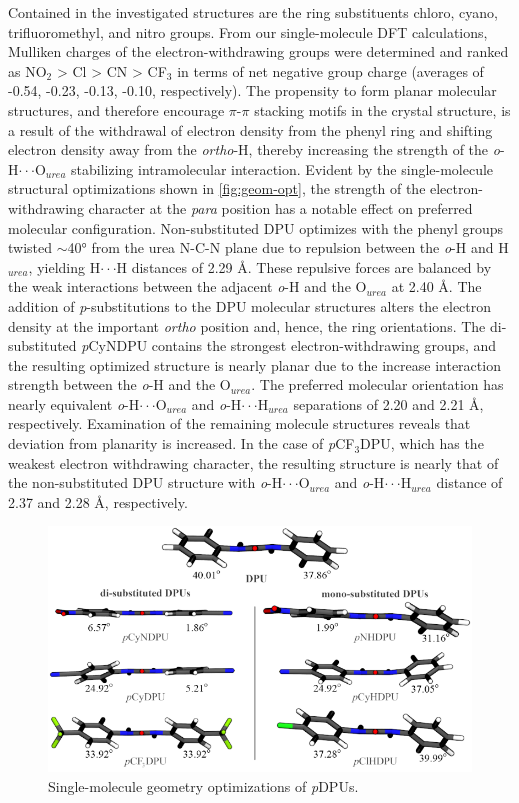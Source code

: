 Contained in the investigated structures are the ring substituents chloro, cyano, trifluoromethyl, and nitro groups. From our single-molecule DFT calculations, Mulliken charges of the electron-withdrawing groups were determined and ranked as NO$_{2}$ > Cl > CN > CF$_{3}$ in terms of net negative group charge (averages of -0.54, -0.23, -0.13, -0.10, respectively). The propensity to form planar molecular structures, and therefore encourage $\pi$-$\pi$ stacking motifs in the crystal structure, is a result of the withdrawal of electron density from the phenyl ring and shifting electron density away from the \textit{ortho}-H, thereby increasing the strength of the \textit{o}-H$\cdot \cdot \cdot$O$_{urea}$ stabilizing intramolecular interaction. Evident by the single-molecule structural optimizations shown in \autoref{fig:geom-opt}, the strength of the electron-withdrawing character at the \textit{para} position has a notable effect on preferred molecular configuration. Non-substituted DPU optimizes with the phenyl groups twisted $\sim$40° from the urea N-C-N plane due to repulsion between the \textit{o}-H and H$_{urea}$, yielding H$\cdot \cdot \cdot$H distances of 2.29 \AA. These repulsive forces are balanced by the weak interactions between the adjacent \textit{o}-H and the O$_{urea}$ at 2.40 \AA. The addition of \textit{p}-substitutions to the DPU molecular structures alters the electron density at the important \textit{ortho} position and, hence, the ring orientations. The di-substituted \textit{p}CyNDPU contains the strongest electron-withdrawing groups, and the resulting optimized structure is nearly planar due to the increase interaction strength between the \textit{o}-H and the O$_{urea}$. The preferred molecular orientation has nearly equivalent \textit{o}-H$\cdot \cdot \cdot$O$_{urea}$ and \textit{o}-H$\cdot \cdot \cdot$H$_{urea}$ separations of 2.20 and 2.21 \AA, respectively. Examination of the remaining molecule structures reveals that deviation from planarity is increased. In the case of \textit{p}CF$_{3}$DPU, which has the weakest electron withdrawing character, the resulting structure is nearly that of the non-substituted DPU structure with \textit{o}-H$\cdot \cdot \cdot$O$_{urea}$ and \textit{o}-H$\cdot \cdot \cdot$H$_{urea}$ distance of 2.37 and 2.28 \AA, respectively. 


\begin{figure}[h!]
    \centering
    \includegraphics[width=0.8\linewidth]{figures/pub3/Picture3.png}
    \caption{Single-molecule geometry optimizations of \textit{p}DPUs.}\label{fig:geom-opt}
\end{figure}

